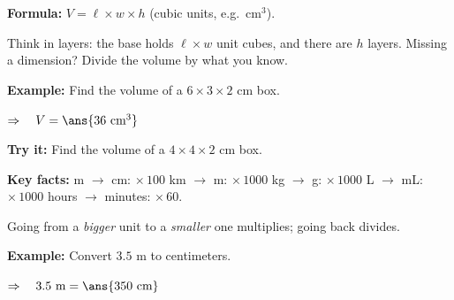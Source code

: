 \documentclass[12pt]{article}
\begin{document}


\begin{formulabox}
\textbf{Formula:} \quad $V = \ell \times w \times h$ \quad (cubic units,
e.g.\ cm$^3$).\par
Think in layers: the base holds $\ell \times w$ unit cubes, and there are
$h$ layers. Missing a dimension? Divide the volume by what you know.
\end{formulabox}

\begin{examplebox}
\textbf{Example:} \quad Find the volume of a $6 \times 3 \times 2$ cm box.

$\Rightarrow\quad V = \ans{36\ \text{cm}^3}$
\end{examplebox}

\begin{tryitbox}
\textbf{Try it:} \quad Find the volume of a $4 \times 4 \times 2$ cm box.\\[2pt]
\end{tryitbox}


\begin{formulabox}
\textbf{Key facts:} \quad
m $\to$ cm: $\times\,100$ \quad\textbullet\quad km $\to$ m: $\times\,1000$
\quad\textbullet\quad kg $\to$ g: $\times\,1000$ \quad\textbullet\quad
L $\to$ mL: $\times\,1000$ \quad\textbullet\quad hours $\to$ minutes:
$\times\,60$.\par
Going from a \emph{bigger} unit to a \emph{smaller} one multiplies; going
back divides.
\end{formulabox}

\begin{examplebox}
\textbf{Example:} \quad Convert $3.5$ m to centimeters.

$\Rightarrow\quad 3.5\ \text{m} = \ans{350\ \text{cm}}$
\end{examplebox}
\end{document}
